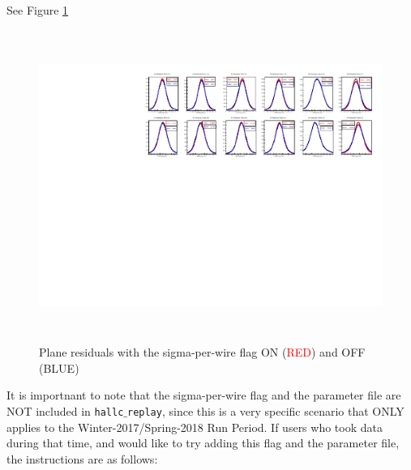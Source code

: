 \documentclass[11pt]{article}
\begin{document}
See Figure \ref{fig:plane_residuals}
\begin{figure}[ht!]
  \hspace*{-1.5cm}                                                           
  \centering
  \includegraphics[width=7.0in, height=4.0in]{residuals_compare.pdf}
  \caption{Plane residuals with the sigma-per-wire flag ON (\textcolor{red}{RED}) and OFF (\textcolor{navyblue}{BLUE})}
  \label{fig:plane_residuals}
\end{figure}
\newline
\noindent It is importnant to note that the sigma-per-wire flag and the parameter file are NOT included in \texttt{hallc$\_$replay}, since this is a very specific scenario that
ONLY applies to the Winter-2017/Spring-2018 Run Period. If users who took data during that time, and would like to try adding this flag and the parameter file,
the instructions are as follows:
\end{document}
